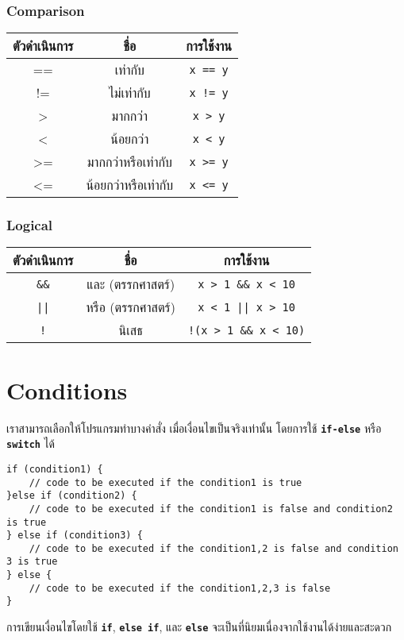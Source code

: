 \subsubsection{Comparison}
\begin{center}
\begin{tabular}{||c|c|c||}
\hline
\textbf{ตัวดำเนินการ} & \textbf{ชื่อ} & \textbf{การใช้งาน} \\
\hline
== & เท่ากับ & \texttt{x == y} \\
!= & ไม่เท่ากับ & \texttt{x != y} \\
> & มากกว่า & \texttt{x > y} \\
< & น้อยกว่า & \texttt{x < y} \\
>= & มากกว่าหรือเท่ากับ & \texttt{x >= y} \\
<= & น้อยกว่าหรือเท่ากับ & \texttt{x <= y} \\
\hline
\end{tabular}
\end{center}

\subsubsection{Logical}
\begin{center}
\begin{tabular}{||c|c|c||}
\hline
\textbf{ตัวดำเนินการ} & \textbf{ชื่อ} & \textbf{การใช้งาน} \\
\hline
\texttt{\&\&} & และ (ตรรกศาสตร์) & \texttt{x > 1 \&\& x < 10} \\
\texttt{||} & หรือ (ตรรกศาสตร์) & \texttt{x < 1 || x > 10} \\
\texttt{!} & นิเสธ & \texttt{!(x > 1 \&\& x < 10)} \\
\hline
\end{tabular}
\end{center}

\newpage
\section{Conditions}
เราสามารถเลือกให้โปรแกรมทำบางคำสั่ง เมื่อเงื่อนไขเป็นจริงเท่านั้น โดยการใช้ \textbf{\texttt{if-else}} หรือ \textbf{\texttt{switch}} ได้
\begin{lstlisting}
if (condition1) {
	// code to be executed if the condition1 is true
}else if (condition2) {
	// code to be executed if the condition1 is false and condition2 is true
} else if (condition3) {
	// code to be executed if the condition1,2 is false and condition 3 is true
} else {
	// code to be executed if the condition1,2,3 is false
}
\end{lstlisting}
การเขียนเงื่อนไขโดยใช้ \textbf{\texttt{if}}, \textbf{\texttt{else if}}, และ \textbf{\texttt{else}} จะเป็นที่นิยมเนื่องจากใช้งานได้ง่ายและสะดวก

